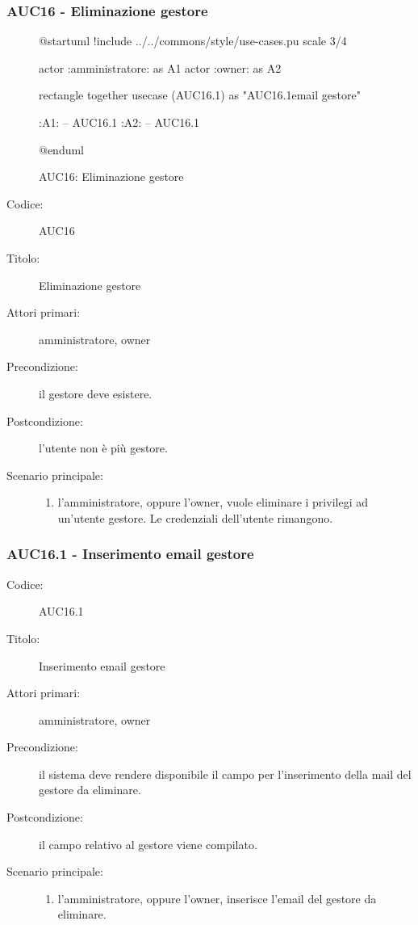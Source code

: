 \documentclass[../analisi-dei-requisiti.tex]{subfiles}
\begin{document}
\subsubsection{AUC16 - Eliminazione gestore}%
\label{subsub:AUC16}

\begin{figure}[h!]
  \centering
  \begin{plantuml}
  @startuml
  !include ../../commons/style/use-cases.pu
  scale 3/4

  actor :amministratore: as A1
  actor :owner: as A2


  rectangle {
    together {
      usecase (AUC16.1) as "AUC16.1\nInserimento email gestore"
    }
  }

  :A1: -- AUC16.1
  :A2: -- AUC16.1

  @enduml
  \end{plantuml}
  \caption{AUC16: Eliminazione gestore}
  \label{fig:auc16}
\end{figure}

\begin{description}
  \item[Codice:] AUC16
  \item[Titolo:] Eliminazione gestore
  \item[Attori primari:] amministratore, owner
  \item[Precondizione:] il gestore deve esistere.
  \item[Postcondizione:] l'utente non è più gestore.
  \item[Scenario principale:]
  \begin{enumerate}
    \item l'amministratore, oppure l'owner, vuole eliminare i privilegi ad un'utente gestore. Le credenziali dell'utente rimangono.
  \end{enumerate}
\end{description}

\subsubsection{AUC16.1 - Inserimento email gestore}%
\label{subsub:AUC16.1}
\begin{description}
  \item[Codice:] AUC16.1
  \item[Titolo:] Inserimento email gestore
  \item[Attori primari:] amministratore, owner
  \item[Precondizione:] il sistema deve rendere disponibile il campo per l'inserimento della mail del gestore da eliminare.
  \item[Postcondizione:] il campo relativo al gestore viene compilato.
  \item[Scenario principale:]
  \begin{enumerate}
    \item l'amministratore, oppure l'owner, inserisce l'email del gestore da eliminare.
  \end{enumerate}
\end{description}
\end{document}
